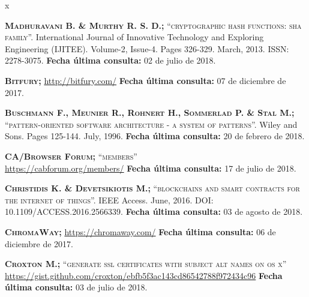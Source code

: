 \begin{thebibliography} {x}
						
	 \textsc{\textbf{Madhuravani B. \& Murthy R. S. D.; }}\textsc{“cryptographic hash functions: sha family”.} International Journal of Innovative Technology and Exploring Engineering (IJITEE). Volume-2, Issue-4. Pages 326-329. March, 2013. ISSN: 2278-3075.
	\newline \textbf{Fecha última consulta:} 02 de julio de 2018.
		
	 \textsc{\textbf{Bitfury; }} 
	\url{http://bitfury.com/}
	\newline \textbf{Fecha última consulta:} 07 de diciembre de 2017.
			
	 \textsc{\textbf{Buschmann F., Meunier R., Rohnert H., Sommerlad P. \& Stal M.; }}\textsc{“pattern-oriented software architecture - a system of patterns”.} Wiley and Sons. Pages 125-144. July, 1996.
	\newline \textbf{Fecha última consulta:} 20 de febrero de 2018.
		
	 \textsc{\textbf{CA/Browser Forum; }}\textsc{“members”} \\ 
	\url{https://cabforum.org/members/}
	\newline \textbf{Fecha última consulta:} 17 de julio de 2018.
		
	 \textsc{\textbf{Christidis K. \& Devetsikiotis M.; }}\textsc{“blockchains and smart contracts for the internet of things”.} IEEE Access. June, 2016. DOI: 10.1109/ACCESS.2016.2566339. 
	\newline \textbf{Fecha última consulta:} 03 de agosto de 2018.
	
	 \textsc{\textbf{ChromaWay; }} 
	\url{https://chromaway.com/}
	\newline \textbf{Fecha última consulta:} 06 de diciembre de 2017.
	
	 \textsc{\textbf{Croxton M.; }}\textsc{“generate ssl certificates with subject alt names on os x”} \\ 
	\url{https://gist.github.com/croxton/ebfb5f3ac143cd86542788f972434c96}
	\newline \textbf{Fecha última consulta:} 03 de julio de 2018.
		

\end{thebibliography}

